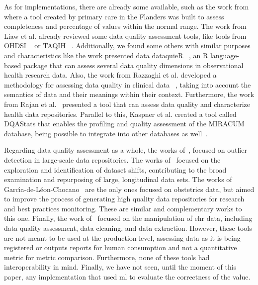 As for implementations, there are already some available, such as the work from \cite{phanAutomatedDataCleaning2020} where a tool created by primary care in the Flanders was built to assess completeness and percentage of values within the normal range. The work from Liaw et al. \cite{liawQualityAssessmentRealworld2021} already reviewed some data quality assessment tools, like tools from OHDSI \unskip~\cite{hripcsakObservationalHealthData2015} or TAQIH \unskip~\cite{alvarezsanchezTAQIHToolTabular2019}. Additionally, we found some others with similar purposes and characteristics like the work presented data dataquieR \unskip~\cite{schmidtFacilitatingHarmonizedData2021}, an R language-based package that can assess several data quality dimensions in observational health research data. Also, the work from Razzaghi et al. developed a methodology for assessing data quality in clinical data \unskip~\cite{razzaghiDevelopingSystematicApproach2022}, taking into account the semantics of data and their meanings within their context. Furthermore, the work from Rajan et al.\unskip~\cite{rajanContentAgnosticComputable2019} presented a tool that can assess data quality and characterize health data repositories. Parallel to this, Kaspner et al. created a tool called DQAStats that enables the profiling and quality assessment of the MIRACUM database, being possible to integrate into other databases as well\unskip~\cite{kapsnerLinkingConsortiumWideData2021a}.


Regarding data quality assessment as a whole, the works of\unskip~\cite{estiriSemisupervisedEncodingOutlier2019}, focused on outlier detection in large-scale data repositories. The works of\unskip~\cite{saezEHRtemporalVariabilityDelineatingTemporal2020} focused on the exploration and identification of dataset shifts, contributing to the broad examination and repurposing of large, longitudinal data sets. The works of Garc\'{\i}a-de-L{\'e}on-Chocano\unskip~\cite{garci;a-de-leon-chocanoConstructionQualityassuredInfant2015,garcia-de-leon-chocanoConstructionQualityassuredInfant2016,saStandardizedDataQuality2017} are the only ones focused on obstetrics data, but aimed to improve the process of generating high quality data repositories for research and best practices monitoring. These are similar and complementary works to this one. Finally, the work of\unskip~\cite{springateREHRPackageManipulating2017} focused on the manipulation of \ac{ehr} data, including data quality assessment, data cleaning, and data extraction. However, these tools are not meant to be used at the production level, assessing data as it is being registered or outputs reports for human consumption and not a quantitative metric for metric comparison. Furthermore, none of these tools had interoperability in mind. Finally, we have not seen, until the moment of this paper, any implementation that used \ac{ml} to evaluate the correctness of the value.

